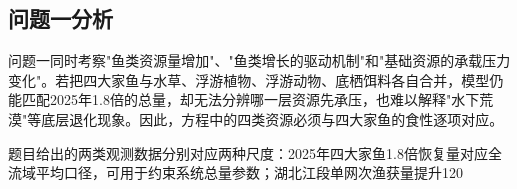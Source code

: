 \subsection{问题一分析}
问题一同时考察"鱼类资源量增加"、"鱼类增长的驱动机制"和"基础资源的承载压力变化"。若把四大家鱼与水草、浮游植物、浮游动物、底栖饵料各自合并，模型仍能匹配2025年1.8倍的总量，却无法分辨哪一层资源先承压，也难以解释"水下荒漠"等底层退化现象。因此，方程中的四类资源必须与四大家鱼的食性逐项对应。

题目给出的两类观测数据分别对应两种尺度：2025年四大家鱼1.8倍恢复量对应全流域平均口径，可用于约束系统总量参数；湖北江段单网次渔获量提升120%

